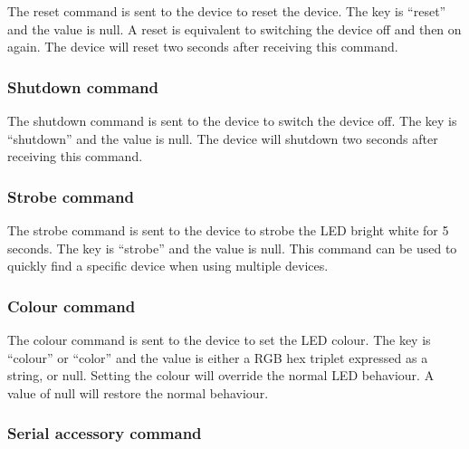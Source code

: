 The reset command is sent to the device to reset the device.  The key is \enquote{reset} and the value is null.  A reset is equivalent to switching the device off and then on again.  The device will reset two seconds after receiving this command.


\subsubsection{Shutdown command}

The shutdown command is sent to the device to switch the device off.  The key is \enquote{shutdown} and the value is null.  The device will shutdown two seconds after receiving this command.





\subsubsection{Strobe command}
\label{sec:strobeCommand}

The strobe command is sent to the device to strobe the \ac{LED} bright white for 5 seconds.  The key is \enquote{strobe} and the value is null.  This command can be used to quickly find a specific device when using multiple devices.


\subsubsection{Colour command}
\label{sec:colourCommand}

The colour command is sent to the device to set the \ac{LED} colour.  The key is \enquote{colour} or \enquote{color} and the value is either a \ac{RGB} hex triplet expressed as a string, or null.  Setting the colour will override the normal \ac{LED} behaviour.  A value of null will restore the normal behaviour.


\subsubsection{Serial accessory command}

